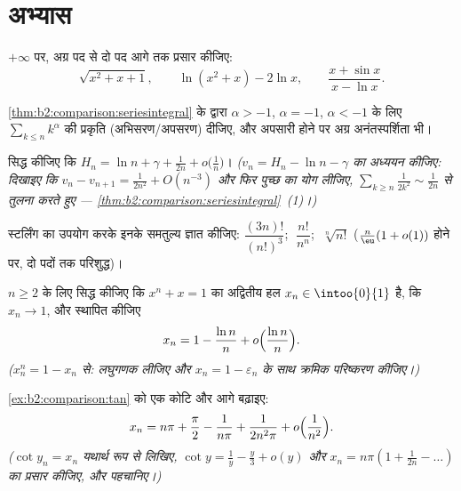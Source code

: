 \section{अभ्यास}

\begin{exercise}[$\star$]\label{exo:b2:comparison:1}
$+\infty$ पर, अग्र पद से दो पद आगे तक प्रसार कीजिए:
\[
\sqrt{x^2 + x + 1} ,
\qquad
\ln(x^2 + x) - 2\ln x,
\qquad
\frac{x + \sin x}{x - \ln x} .
\]
\end{exercise}

\begin{exercise}[$\star$]\label{exo:b2:comparison:2}
\cref{thm:b2:comparison:seriesintegral} के द्वारा $\alpha >
-1$, $\alpha = -1$, $\alpha < -1$ के लिए $\sum_{k \leq n} k^\alpha$ की प्रकृति (अभिसरण/अपसरण) दीजिए,
और अपसारी होने पर अग्र अनंतस्पर्शिता भी।
\end{exercise}

\begin{exercise}[$\star\star$]\label{exo:b2:comparison:3}
सिद्ध कीजिए कि $H_n = \ln n + \gamma + \frac{1}{2n} + o\bigl(\frac1n\bigr)$। \emph{($v_n = H_n - \ln n - \gamma$ का अध्ययन कीजिए: दिखाइए कि $v_n - v_{n+1} =
\frac{1}{2n^2} + O(n^{-3})$ और फिर
पुच्छ का योग लीजिए, $\sum_{k \geq n} \frac{1}{2k^2} \sim \frac{1}{2n}$ से तुलना करते हुए --- \cref{thm:b2:comparison:seriesintegral}~(1)।)}
\end{exercise}

\begin{exercise}[$\star\star$]\label{exo:b2:comparison:4}
स्टर्लिंग का उपयोग करके इनके समतुल्य ज्ञात कीजिए: $\dfrac{(3n)!}{(n!)^3}$; $\;\dfrac{n!}{n^n}$; $\;\sqrt[n]{n!}$ ($\frac n\eu(1 + o(1))$
होने पर, दो पदों तक परिशुद्ध)।
\end{exercise}

\begin{exercise}[$\star\star$]\label{exo:b2:comparison:5}
$n \geq 2$ के लिए सिद्ध कीजिए कि $x^n + x = 1$ का अद्वितीय हल $x_n
\in \intoo{0}{1}$ है, कि $x_n \to 1$, और
स्थापित कीजिए
\[
x_n = 1 - \frac{\ln n}{n} + o\Bigl(\frac{\ln n}{n}\Bigr).
\]
\emph{($x_n^n = 1 - x_n$ से: लघुगणक लीजिए और $x_n = 1 - \varepsilon_n$ के साथ क्रमिक परिष्करण कीजिए।)}
\end{exercise}

\begin{exercise}[$\star\star$]\label{exo:b2:comparison:6}
\cref{ex:b2:comparison:tan} को एक कोटि और आगे बढ़ाइए:
\[
x_n = n\pi + \frac\pi2 - \frac{1}{n\pi} + \frac{1}{2n^2\pi} +
o\Bigl(\frac{1}{n^2}\Bigr).
\]
\emph{($\cot y_n = x_n$ यथार्थ रूप से लिखिए, $\cot y = \frac1y -
\frac y3 + o(y)$ और $x_n = n\pi(1 + \frac{1}{2n} - \dots)$ का प्रसार कीजिए, और पहचानिए।)}
\end{exercise}

